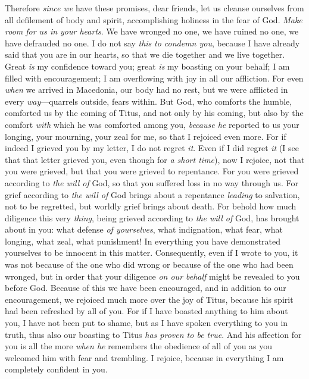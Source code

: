 \begin{biblechapter} %
 Therefore \textit{since we} have these promises, dear friends, let us cleanse ourselves from all defilement of body and spirit, accomplishing holiness in the fear of God.
\verse \textit{Make room for us in your hearts}. We have wronged no one, we have ruined no one, we have defrauded no one.
\verse I do not say \textit{this} \textit{to condemn you}, because I have already said that you are in our hearts, so that we die together and we live together.
\verse Great \textit{is} my confidence toward you; great \textit{is} my boasting on your behalf; I am filled with encouragement; I am overflowing with joy in all our affliction.
\verse For even \textit{when} we arrived in Macedonia, our body had no rest, but we were afflicted in every \textit{way}—quarrels outside, fears within.
\verse But God, who comforts the humble, comforted us by the coming of Titus,
\verse and not only by his coming, but also by the comfort \textit{with} which he was comforted among you, \textit{because he} reported to us your longing, your mourning, your zeal for me, so that I rejoiced even more.
\verse For if indeed I grieved you by my letter, I do not regret \textit{it}. Even if I did regret \textit{it} (I see that that letter grieved you, even though for \textit{a short time}),
\verse now I rejoice, not that you were grieved, but that you were grieved to repentance. For you were grieved according to \textit{the will of} God, so that you suffered loss in no way through us.
\verse For grief according to \textit{the will of} God brings about a repentance \textit{leading} to salvation, not to be regretted, but worldly grief brings about death.
\verse For behold how much diligence this very \textit{thing}, being grieved according to \textit{the will of} God, has brought about in you: what defense \textit{of yourselves}, what indignation, what fear, what longing, what zeal, what punishment! In everything you have demonstrated yourselves to be innocent in this matter.
\verse Consequently, even if I wrote to you, it was not because of the one who did wrong or because of the one who had been wronged, but in order that your diligence \textit{on our behalf} might be revealed to you before God.
\verse Because of this we have been encouraged, and in addition to our encouragement, we rejoiced much more over the joy of Titus, because his spirit had been refreshed by all of you.
\verse For if I have boasted anything to him about you, I have not been put to shame, but as I have spoken everything to you in truth, thus also our boasting to Titus \textit{has proven to be true}.
\verse And his affection for you is all the more \textit{when he} remembers the obedience of all of you as you welcomed him with fear and trembling.
\verse I rejoice, because in everything I am completely confident in you.
\end{biblechapter}

